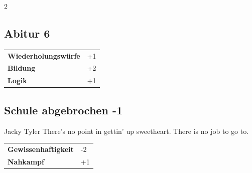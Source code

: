 \begin{multicols}{2}
\begin{tcolorbox}

\end{tcolorbox}

\begin{tcolorbox}
    \subsection*{Abitur \hfill \small{6 }}
    \tcblower




\begin{tabular}{@{}ll@{}}
    \textbf{Wiederholungswürfe} & +1\\
    \textbf{Bildung} & +2\\
    \textbf{Logik} & +1\\
\end{tabular}


\end{tcolorbox}

\begin{tcolorbox}
    \subsection*{Schule abgebrochen \hfill \small{-1 }}
    \tcblower


\begin{pquote}{Jacky Tyler}
There's no point in gettin' up sweetheart. There is no job to go to.
\end{pquote}

\vspace{3mm}

\begin{tabular}{@{}ll@{}}
    \textbf{Gewissenhaftigkeit} & -2\\
    \textbf{Nahkampf} & +1\\
\end{tabular}



\end{tcolorbox}
\end{multicols}

